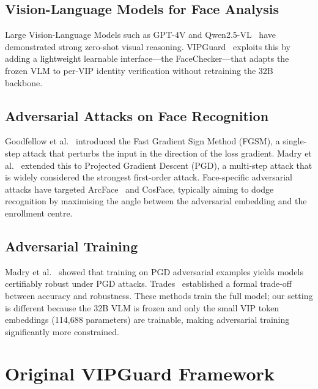\documentclass[12pt,a4paper]{article}
\begin{document}
\subsection{Vision-Language Models for Face Analysis}

Large Vision-Language Models such as GPT-4V and Qwen2.5-VL~\cite{bai2025qwen2vl} have
demonstrated strong zero-shot visual reasoning.  VIPGuard~\cite{vipguard2024}
exploits this by adding a lightweight learnable interface---the FaceChecker---that
adapts the frozen VLM to per-VIP identity verification without retraining the
32B backbone.

\subsection{Adversarial Attacks on Face Recognition}

Goodfellow et al.~\cite{goodfellow2014explaining} introduced the Fast Gradient Sign
Method (FGSM), a single-step attack that perturbs the input in the direction of
the loss gradient.  Madry et al.~\cite{madry2018towards} extended this to
Projected Gradient Descent (PGD), a multi-step attack that is widely considered
the strongest first-order attack.  Face-specific adversarial attacks have targeted
ArcFace~\cite{deng2019arcface} and CosFace, typically aiming to dodge recognition
by maximising the angle between the adversarial embedding and the enrollment
centre.

\subsection{Adversarial Training}

Madry et al.~\cite{madry2018towards} showed that training on PGD adversarial
examples yields models certifiably robust under PGD attacks.  Trades~\cite{zhang2019theoretically}
established a formal trade-off between accuracy and robustness.  These methods
train the full model; our setting is different because the 32B VLM is frozen and
only the small VIP token embeddings (114,688 parameters) are trainable, making
adversarial training significantly more constrained.

\section{Original VIPGuard Framework}
\end{document}

